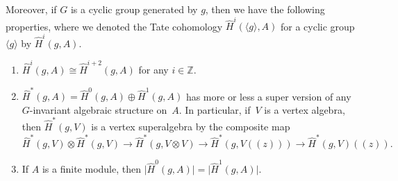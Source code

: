 Moreover, if $G$ is a cyclic group generated by $g$, then we have the following properties, where we denoted the Tate cohomology $\hat{H}^i(\langle g\rangle,A)$ for a cyclic group $\langle g\rangle$ by $\hat{H}^i(g,A)$.
\begin{enumerate}\itemsep=0pt
\item[(3)] ${\hat{H}}^i(g,A)\cong{\hat{H}}^{i+2}(g,A)$ for any $i\in\mathbb{Z}$.
\item[(4)]\label{Tsuper} ${\hat{H}}^\ast (g,A )=\hat{H}^0(g,A)\oplus\hat{H}^1(g,A)$ has more or less a super version of any $G$-invariant algebraic structure on~$A$. In particular, if~$V$ is a vertex algebra, then $\hat{H}^*(g,V)$ is a vertex superalgebra by the composite map
\[
\hat{H}^*(g,V)\otimes \hat{H}^*(g,V)\rightarrow \hat{H}^*(g,V\otimes V)\rightarrow \hat{H}^*(g,V((z)))\rightarrow \hat{H}^*(g,V)((z)).
\]
\item[(5)] If $A$ is a finite module, then $\big|{\hat{H}}^0(g,A)\big|=\big|{\hat{H}}^1(g,A)\big|$.
\end{enumerate}
